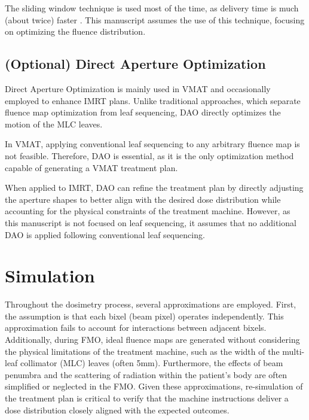 The sliding window technique is used most of the time, as delivery time is much (about twice) faster \cite{Ning2003}.
This manuscript assumes the use of this technique, focusing on optimizing the fluence distribution.

\subsection[DAO]{(Optional) Direct Aperture Optimization}
Direct Aperture Optimization is mainly used in VMAT and occasionally employed to enhance IMRT plans.
Unlike traditional approaches, which separate fluence map optimization from leaf sequencing, DAO directly optimizes the motion of the MLC leaves.

In VMAT, applying conventional leaf sequencing to any arbitrary fluence map is not feasible.
Therefore, DAO is essential, as it is the only optimization method capable of generating a VMAT treatment plan.

When applied to IMRT, DAO can refine the treatment plan by directly adjusting the aperture shapes to better align with the desired dose distribution while accounting for the physical constraints of the treatment machine.
However, as this manuscript is not focused on leaf sequencing, it assumes that no additional DAO is applied following conventional leaf sequencing.






\section{Simulation}
Throughout the dosimetry process, several approximations are employed.
First, the assumption is that each bixel (beam pixel) operates independently.
This approximation fails to account for interactions between adjacent bixels.
Additionally, during FMO, ideal fluence maps are generated without considering the physical limitations of the treatment machine, such as the width of the multi-leaf collimator (MLC) leaves (often 5mm).
Furthermore, the effects of beam penumbra and the scattering of radiation within the patient's body are often simplified or neglected in the FMO.
Given these approximations, re-simulation of the treatment plan is critical to verify that the machine instructions deliver a dose distribution closely aligned with the expected outcomes.


